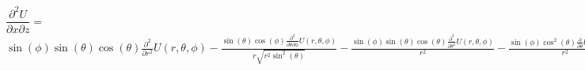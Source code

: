 \documentclass{report}
\begin{document}
\newpage
$\dfrac{\partial^2 U}{\partial x \partial z} =$
\\
$\sin{\left(\phi \right)} \sin{\left(\theta \right)} \cos{\left(\theta \right)} \frac{\partial^{2}}{\partial r^{2}} U{\left(r,\theta,\phi \right)} - \frac{\sin{\left(\theta \right)} \cos{\left(\phi \right)} \frac{\partial^{2}}{\partial \theta\partial \phi} U{\left(r,\theta,\phi \right)}}{r \sqrt{r^{2} \sin^{2}{\left(\theta \right)}}} - \frac{\sin{\left(\phi \right)} \sin{\left(\theta \right)} \cos{\left(\theta \right)} \frac{\partial^{2}}{\partial \theta^{2}} U{\left(r,\theta,\phi \right)}}{r^{2}} - \frac{\sin{\left(\phi \right)} \cos^{2}{\left(\theta \right)} \frac{\partial}{\partial \theta} U{\left(r,\theta,\phi \right)}}{r^{2}} - \frac{\left(r^{2}\right)^{\frac{3}{2}} \sin{\left(\phi \right)} \sin^{3}{\left(\theta \right)} \frac{\partial^{2}}{\partial \theta\partial r} U{\left(r,\theta,\phi \right)}}{r^{3} \sqrt{r^{2} \sin^{2}{\left(\theta \right)}}} + \frac{\left(r^{2}\right)^{\frac{3}{2}} \sin{\left(\phi \right)} \sin{\left(2 \theta \right)} \cos{\left(\theta \right)} \frac{\partial^{2}}{\partial \theta\partial r} U{\left(r,\theta,\phi \right)}}{2 r^{3} \sqrt{r^{2} \sin^{2}{\left(\theta \right)}}} + \frac{\left(r^{2}\right)^{\frac{3}{2}} \sin{\left(\phi \right)} \cos{\left(\theta \right)} \cos{\left(2 \theta \right)} \frac{\partial}{\partial r} U{\left(r,\theta,\phi \right)}}{2 r^{3} \sqrt{r^{2} \sin^{2}{\left(\theta \right)}}} - \frac{\left(r^{2}\right)^{\frac{3}{2}} \sin{\left(\phi \right)} \cos{\left(\theta \right)} \frac{\partial}{\partial r} U{\left(r,\theta,\phi \right)}}{2 r^{3} \sqrt{r^{2} \sin^{2}{\left(\theta \right)}}} + \frac{\left(r^{2}\right)^{\frac{3}{2}} \cos{\left(\phi \right)} \cos{\left(\theta \right)} \frac{\partial^{2}}{\partial r\partial \phi} U{\left(r,\theta,\phi \right)}}{r^{4} \sin{\left(\theta \right)}} + \frac{\left(r^{2}\right)^{\frac{3}{2}} \sin{\left(\phi \right)} \sin^{3}{\left(\theta \right)} \frac{\partial}{\partial \theta} U{\left(r,\theta,\phi \right)}}{r^{4} \sqrt{r^{2} \sin^{2}{\left(\theta \right)}}}$
\end{document}
